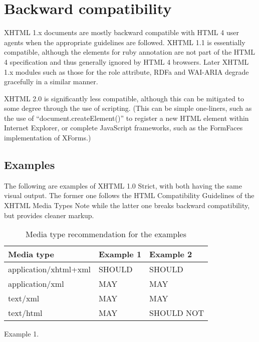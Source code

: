 \chapter{Backward compatibility}

XHTML 1.x documents are mostly backward compatible with HTML 4 user agents when the appropriate guidelines are followed. XHTML 1.1 is essentially compatible, although the elements for ruby annotation are not part of the HTML 4 specification and thus generally ignored by HTML 4 browsers. Later XHTML 1.x modules such as those for the role attribute, RDFa and WAI-ARIA degrade gracefully in a similar manner.

XHTML 2.0 is significantly less compatible, although this can be mitigated to some degree through the use of scripting. (This can be simple one-liners, such as the use of “document.createElement()” to register a new HTML element within Internet Explorer, or complete JavaScript frameworks, such as the FormFaces implementation of XForms.)




\section{Examples}


The following are examples of XHTML 1.0 Strict, with both having the same visual output. The former one follows the HTML Compatibility Guidelines of the XHTML Media Types Note while the latter one breaks backward compatibility, but provides cleaner markup.


\begin{table}
\centering
\caption{Media type recommendation for the examples}
\begin{tabular}{|l|l|l|}
\hline
Media type			&Example 1	&Example 2\\
\hline
application/xhtml+xml	&SHOULD	&SHOULD\\
\hline
application/xml		&MAY		&MAY\\
\hline
text/xml				&MAY		&MAY\\
\hline
text/html				&MAY		&SHOULD NOT\\
\hline
\end{tabular}
\end{table}

Example 1.

